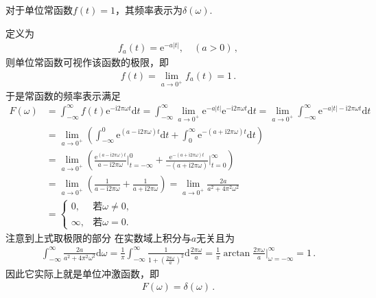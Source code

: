 \begin{theorem}\label{theorem:7.ex01.3}
    对于单位常函数$f(t)=1$，其频率表示为$\delta(\omega)$.
\end{theorem}
\begin{prove}
    定义为
    \begin{align}
        f_a(t)=\mathrm{e}^{-a|t|},\quad (a>0)\, ,
    \end{align}
    则单位常函数可视作该函数的极限，即
    \begin{align}
        f(t)=\lim\limits_{a\rightarrow0^+}f_a(t)=1\, .
    \end{align}
    于是常函数的频率表示满足
    \begin{align}
        F(\omega) & =\int_{-\infty}^{\infty}f(t)\mathrm{e}^{-\mathrm{i}2\pi\omega t}\mathrm{d}t
        =\int_{-\infty}^{\infty}\lim\limits_{a\rightarrow0^+}\mathrm{e}^{-a|t|}\mathrm{e}^{-\mathrm{i}2\pi\omega t}\mathrm{d}t
        =\lim\limits_{a\rightarrow0^+}\int_{-\infty}^{\infty}\mathrm{e}^{-a|t|-\mathrm{i}2\pi\omega t}\mathrm{d}t\nonumber                                                                                  \\
                  & =\lim\limits_{a\rightarrow0^+}\left(\int_{-\infty}^0\mathrm{e}^{(a-\mathrm{i}2\pi\omega)t}\mathrm{d}t+\int_0^{\infty}\mathrm{e}^{-(a+\mathrm{i}2\pi\omega)t}\mathrm{d}t\right)\nonumber \\
                  & =\lim\limits_{a\rightarrow0^+}\left(\frac{\mathrm{e}^{(a-\mathrm{i}2\pi\omega)t}}{a-\mathrm{i}2\pi\omega}\bigg|_{t=-\infty}^0
        +\frac{\mathrm{e}^{-(a+\mathrm{i}2\pi\omega)t}}{-(a+\mathrm{i}2\pi\omega)}\bigg|_{t=0}^{\infty}\right)\nonumber                                                                                     \\
                  & =\lim\limits_{a\rightarrow0^+}\left(\frac{1}{a-\mathrm{i}2\pi\omega}+\frac{1}{a+\mathrm{i}2\pi\omega}\right)=\lim\limits_{a\rightarrow0^+}\frac{2a}{a^2+4\pi^2\omega^2}\nonumber        \\
                  & =\left\{\begin{array}{ll}
            0,      & \text{若}\omega\neq0, \\
            \infty, & \text{若}\omega=0.
        \end{array}\right.
    \end{align}
    注意到上式取极限的部分
    在实数域上积分与$a$无关且为
    \begin{align}
        \int_{-\infty}^{\infty}\frac{2a}{a^2+4\pi^2\omega^2}\mathrm{d}\omega
        =\frac{1}{\pi}\int_{-\infty}^{\infty}\frac{1}{1+\left(\frac{2\pi\omega}{a}\right)^2}\mathrm{d}\frac{2\pi\omega}{a}
        =\frac{1}{\pi}\arctan\frac{2\pi\omega}{a}\bigg|_{\omega=-\infty}^{\infty}=1\, .
    \end{align}
    因此它实际上就是单位冲激函数，即
    \begin{align}
        F(\omega)=\delta(\omega)\, .
    \end{align}
\end{prove}
